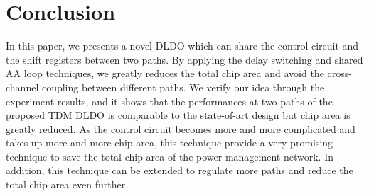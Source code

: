 \documentclass[journal]{IEEEtran}
\begin{document}
\section{Conclusion}
In this paper, we presents a novel DLDO which can share the control circuit and the shift registers between two paths. By applying the delay switching and shared AA loop techniques, we greatly reduces the total chip area and avoid the cross-channel coupling between different paths. We verify our idea through the experiment results, and it shows that the performances at two paths of the proposed TDM DLDO is comparable to the state-of-art design but chip area is greatly reduced. As the control circuit becomes more and more complicated and takes up more and more chip area, this technique provide a very promising technique to save the total chip area of the power management network. In addition, this technique can be extended to regulate more paths and reduce the total chip area even further.


\end{document}
